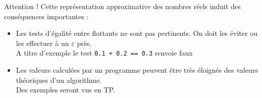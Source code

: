 \documentclass[10pt,french]{beamer}
\begin{document}
\begin{frame}{\Ctitle}{\stitle}
	\begin{alertblock}{\textcolor{yellow}{\important} Attention !}
		Cette représentation approximative des nombres réels induit des conséquences importantes :
		\begin{itemize}
			\item<2-> Les tests d'égalité entre flottants ne sont pas pertinents. On doit les éviter ou les effectuer à un $\varepsilon$ près. \\
				\onslide<3-> A titre d'exemple le test {\tt 0.1 + 0.2 == 0.3} renvoie faux
			\item<4-> Les valeurs calculées par un programme peuvent être très éloignés des valeurs théoriques d'un algorithme.\\
				\onslide<5-> Des exemples seront vus en TP.
		\end{itemize}
	\end{alertblock}
\end{frame}
\end{document}
